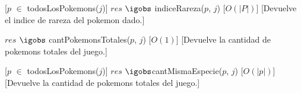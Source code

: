 \begin{Interfaz}
%
[$p$ $\in$ todosLosPokemons($j$)] 
{$res$ $\igobs$ indiceRareza($p$, $j$)}  %
[$O(|P|)$] %
[Devuelve el indice de rareza del pokemon dado.]


%
{$res$ $\igobs$ cantPokemonsTotales($p$, $j$)}  %
[$O(1)$] %
[Devuelve la cantidad de pokemons totales del juego.]



[$p$ $\in$ todosLosPokemons($j$)] 
{$res$ $\igobs $cantMismaEspecie($p$, $j$)}  %
[$O(|p|)$] %
[Devuelve la cantidad de pokemons totales del juego.]


\end{Interfaz}

~ 

